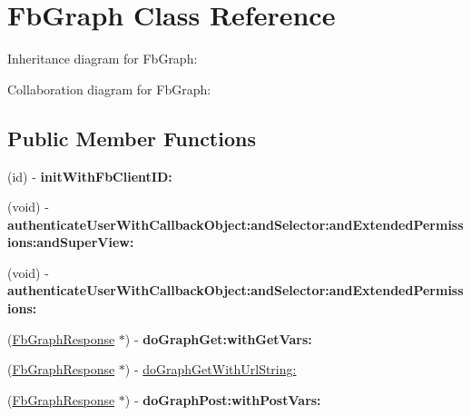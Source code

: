 \hypertarget{interface_fb_graph}{
\section{\-Fb\-Graph \-Class \-Reference}
\label{interface_fb_graph}
}


\-Inheritance diagram for \-Fb\-Graph\-:


\-Collaboration diagram for \-Fb\-Graph\-:
\subsection*{\-Public \-Member \-Functions}
\begin{DoxyCompactItemize}
\item 
\hypertarget{interface_fb_graph_afd510d4c2b40e9c3057829c3a44d46dc}{
(id) -\/ {\bfseries init\-With\-Fb\-Client\-I\-D\-:}}
\label{interface_fb_graph_afd510d4c2b40e9c3057829c3a44d46dc}

\item 
\hypertarget{interface_fb_graph_a1bc31d022ed142e48addf23d40119a02}{
(void) -\/ {\bfseries authenticate\-User\-With\-Callback\-Object\-:and\-Selector\-:and\-Extended\-Permissions\-:and\-Super\-View\-:}}
\label{interface_fb_graph_a1bc31d022ed142e48addf23d40119a02}

\item 
\hypertarget{interface_fb_graph_af67e03ac3dfd34b8cb954cfcf633595a}{
(void) -\/ {\bfseries authenticate\-User\-With\-Callback\-Object\-:and\-Selector\-:and\-Extended\-Permissions\-:}}
\label{interface_fb_graph_af67e03ac3dfd34b8cb954cfcf633595a}

\item 
\hypertarget{interface_fb_graph_aa17e4cf632e883ccce808d0afce0f396}{
(\hyperlink{interface_fb_graph_response}{\-Fb\-Graph\-Response} $\ast$) -\/ {\bfseries do\-Graph\-Get\-:with\-Get\-Vars\-:}}
\label{interface_fb_graph_aa17e4cf632e883ccce808d0afce0f396}

\item 
(\hyperlink{interface_fb_graph_response}{\-Fb\-Graph\-Response} $\ast$) -\/ \hyperlink{interface_fb_graph_ab40685f4804b7cf54eead42829ba406e}{do\-Graph\-Get\-With\-Url\-String\-:}
\item 
\hypertarget{interface_fb_graph_a2a8d5f375485e446458fba832fe03c81}{
(\hyperlink{interface_fb_graph_response}{\-Fb\-Graph\-Response} $\ast$) -\/ {\bfseries do\-Graph\-Post\-:with\-Post\-Vars\-:}}
\label{interface_fb_graph_a2a8d5f375485e446458fba832fe03c81}


\end{DoxyCompactItemize}

